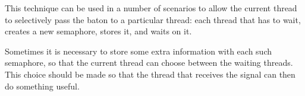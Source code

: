 
\begin{slide}

This technique can be used in a number of scenarios to allow the current
thread to selectively pass the baton to a particular thread: each thread that
has to wait, creates a new semaphore, stores it, and waits on it.

Sometimes it is necessary to store some extra information with each such
semaphore, so that the current thread can choose between the waiting threads.
This choice should be made so that the thread that receives the signal can
then do something useful. 
\end{slide}
